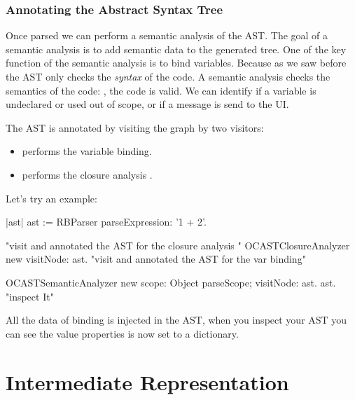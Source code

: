 \documentclass[a4paper,10pt,twoside]{book}
\begin{document}
\subsubsection{Annotating the Abstract Syntax Tree}

Once parsed we can perform a semantic analysis of the AST. The goal of a semantic analysis is to add semantic data to the generated tree. One of the key function of the semantic analysis is to bind variables. 
Because as we saw before the AST only checks the \emph{syntax} of the code. A semantic analysis  checks the semantics of the code: , the code is valid. We can identify if a variable is undeclared or used out of scope, or if a message is send to the UI. 

The AST is annotated by visiting the graph by two visitors:
\begin{itemize}
\item {} performs the variable binding.
\item {} performs the closure analysis .
\end{itemize}

Let's try an example:

\begin{code}{}
|ast|
ast := RBParser parseExpression: '1 + 2'.

"visit and annotated the AST for the closure analysis "
OCASTClosureAnalyzer new visitNode: ast.
"visit and annotated the AST for the var binding"

OCASTSemanticAnalyzer new
		scope: Object parseScope;
		visitNode: ast.
ast. "inspect It"
\end{code}



All the data of binding is injected in the AST, when you inspect your AST you can see the value properties is now 
set to a dictionary.  



\section{Intermediate Representation}
\end{document}
